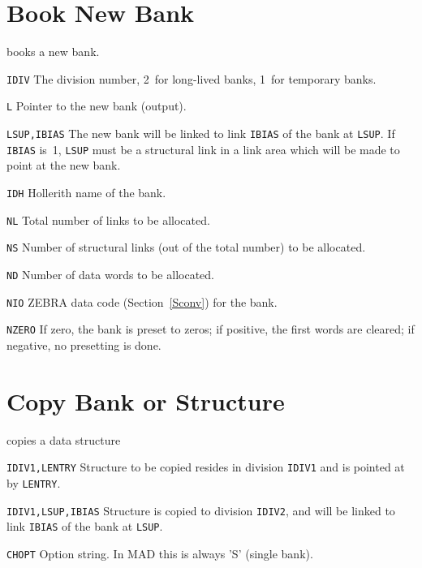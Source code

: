 \section{Book New Bank}
\label{MZBOOK}
books a new bank.
\begin{mylist}
\item[\tt IDIV]
    The division number, 2~for long-lived banks, 1~for temporary banks.
\item[\tt L]
    Pointer to the new bank (output).
\item[\tt LSUP,IBIAS]
    The new bank will be linked to link {\tt IBIAS} of the bank at
    {\tt LSUP}. 
    If {\tt IBIAS} is~1, {\tt LSUP} must be a structural link in a
    link area which will be made to point at the new bank.
\item[\tt IDH]
    Hollerith name of the bank.
\item[\tt NL]
    Total number of links to be allocated.
\item[\tt NS]
    Number of structural links (out of the total number) to be
    allocated. 
\item[\tt ND]
    Number of data words to be allocated.
\item[\tt NIO]
    ZEBRA data code (Section~\ref{Sconv}) for the bank.
\item[\tt NZERO]
    If zero, the bank is preset to zeros; if positive,
    the first  words are cleared;
    if negative, no presetting is done.
\end{mylist}

\section{Copy Bank or Structure}
\label{MZCOPY}
copies a data structure
\begin{mylist}
\item[\tt IDIV1,LENTRY]
    Structure to be copied resides in division {\tt IDIV1} and is
    pointed at by {\tt LENTRY}.
\item[\tt IDIV1,LSUP,IBIAS]
    Structure is copied to division {\tt IDIV2}, and will be linked
    to link {\tt IBIAS} of the bank at {\tt LSUP}.
\item[\tt CHOPT]
    Option string. In MAD this is always 'S' (single bank).
\end{mylist}

